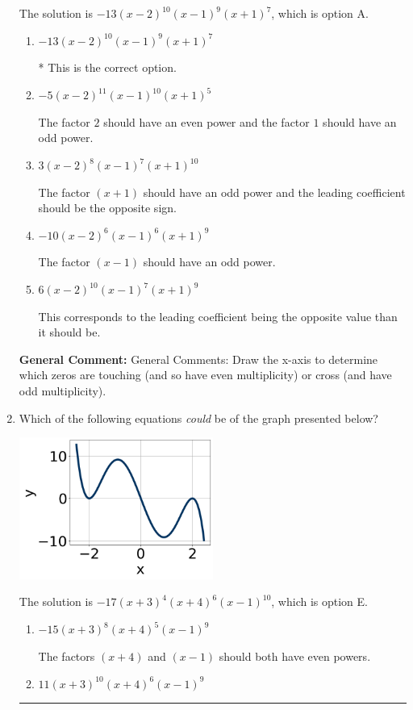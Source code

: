 \documentclass{extbook}[14pt]
\newcommand{\litem}[1]{\item #1

\rule{\textwidth}{0.4pt}}
\begin{document}
\begin{enumerate}
{The solution is \( -13(x - 2)^{10} (x - 1)^{9} (x + 1)^{7} \), which is option A.\begin{enumerate}[label=\Alph*.]
\item \( -13(x - 2)^{10} (x - 1)^{9} (x + 1)^{7} \)

* This is the correct option.
\item \( -5(x - 2)^{11} (x - 1)^{10} (x + 1)^{5} \)

The factor $2$ should have an even power and the factor $1$ should have an odd power.
\item \( 3(x - 2)^{8} (x - 1)^{7} (x + 1)^{10} \)

The factor $(x + 1)$ should have an odd power and the leading coefficient should be the opposite sign.
\item \( -10(x - 2)^{6} (x - 1)^{6} (x + 1)^{9} \)

The factor $(x - 1)$ should have an odd power.
\item \( 6(x - 2)^{10} (x - 1)^{7} (x + 1)^{9} \)

This corresponds to the leading coefficient being the opposite value than it should be.
\end{enumerate}

\textbf{General Comment:} General Comments: Draw the x-axis to determine which zeros are touching (and so have even multiplicity) or cross (and have odd multiplicity).
}
\litem{
Which of the following equations \textit{could} be of the graph presented below?

\begin{center}
    \includegraphics[width=0.5\textwidth]{../Figures/polyGraphToFunctionC.png}
\end{center}


The solution is \( -17(x + 3)^{4} (x + 4)^{6} (x - 1)^{10} \), which is option E.\begin{enumerate}[label=\Alph*.]
\item \( -15(x + 3)^{8} (x + 4)^{5} (x - 1)^{9} \)

The factors $(x + 4)$ and $(x - 1)$ should both have even powers.
\item \( 11(x + 3)^{10} (x + 4)^{6} (x - 1)^{9} \)


\end{enumerate}}
\end{enumerate}
\end{document}
